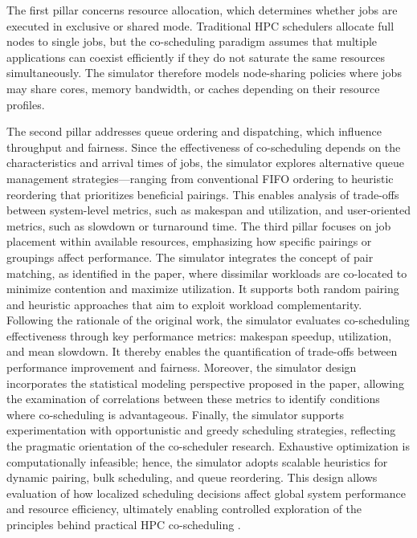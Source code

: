 The first pillar concerns resource allocation, which determines whether jobs are executed in exclusive or shared mode. Traditional HPC schedulers allocate full nodes to single jobs, but the co-scheduling paradigm assumes that multiple applications can coexist efficiently if they do not saturate the same resources simultaneously. The simulator therefore models node-sharing policies where jobs may share cores, memory bandwidth, or caches depending on their resource profiles.

The second pillar addresses queue ordering and dispatching, which influence throughput and fairness. Since the effectiveness of co-scheduling depends on the characteristics and arrival times of jobs, the simulator explores alternative queue management strategies—ranging from conventional FIFO ordering to heuristic reordering that prioritizes beneficial pairings. This enables analysis of trade-offs between system-level metrics, such as makespan and utilization, and user-oriented metrics, such as slowdown or turnaround time.
The third pillar focuses on job placement within available resources, emphasizing how specific pairings or groupings affect performance. The simulator integrates the concept of pair matching, as identified in the paper, where dissimilar workloads are co-located to minimize contention and maximize utilization. It supports both random pairing and heuristic approaches that aim to exploit workload complementarity.
Following the rationale of the original work, the simulator evaluates co-scheduling effectiveness through key performance metrics: makespan speedup, utilization, and mean slowdown. It thereby enables the quantification of trade-offs between performance improvement and fairness. Moreover, the simulator design incorporates the statistical modeling perspective proposed in the paper, allowing the examination of correlations between these metrics to identify conditions where co-scheduling is advantageous.
Finally, the simulator supports experimentation with opportunistic and greedy scheduling strategies, reflecting the pragmatic orientation of the co-scheduler research. Exhaustive optimization is computationally infeasible; hence, the simulator adopts scalable heuristics for dynamic pairing, bulk scheduling, and queue reordering. This design allows evaluation of how localized scheduling decisions affect global system performance and resource efficiency, ultimately enabling controlled exploration of the principles behind practical HPC co-scheduling \cite{unknown}.

